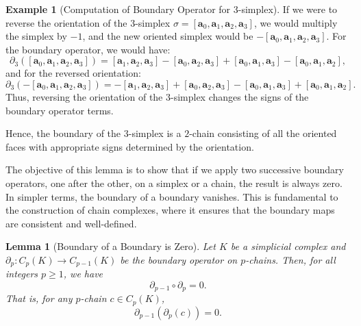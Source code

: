 \documentclass[12pt,oneside,reqno]{amsart}
\theoremstyle{plain}
\newtheorem{lemma}[theorem]{Lemma}
\theoremstyle{definition}
\newtheorem{example}{Example}[section]
\theoremstyle{remark}
\newcommand{\0}{{\textbf{0}}}
\begin{document}
\begin{example}[Computation of Boundary Operator for 3-simplex]
If we were to reverse the orientation of the $3$-simplex $\sigma = [\mathbf{a}_0, \mathbf{a}_1, \mathbf{a}_2, \mathbf{a}_3]$, we would multiply the simplex by $-1$, and the new oriented simplex would be $-[\mathbf{a}_0, \mathbf{a}_1, \mathbf{a}_2, \mathbf{a}_3]$. For the boundary operator, we would have:
\[
\partial_3([\mathbf{a}_0, \mathbf{a}_1, \mathbf{a}_2, \mathbf{a}_3]) = [\mathbf{a}_1, \mathbf{a}_2, \mathbf{a}_3] - [\mathbf{a}_0, \mathbf{a}_2, \mathbf{a}_3] + [\mathbf{a}_0, \mathbf{a}_1, \mathbf{a}_3] - [\mathbf{a}_0, \mathbf{a}_1, \mathbf{a}_2],
\]
and for the reversed orientation:
\[
\partial_3(-[\mathbf{a}_0, \mathbf{a}_1, \mathbf{a}_2, \mathbf{a}_3]) = -[\mathbf{a}_1, \mathbf{a}_2, \mathbf{a}_3] + [\mathbf{a}_0, \mathbf{a}_2, \mathbf{a}_3] - [\mathbf{a}_0, \mathbf{a}_1, \mathbf{a}_3] + [\mathbf{a}_0, \mathbf{a}_1, \mathbf{a}_2].
\]
Thus, reversing the orientation of the $3$-simplex changes the signs of the boundary operator terms.

Hence, the boundary of the $3$-simplex is a $2$-chain consisting of all the oriented faces with appropriate signs determined by the orientation.
\end{example}

The objective of this lemma is to show that if we apply two successive boundary operators, one after the other, on a simplex or a chain, the result is always zero. In simpler terms, the boundary of a boundary vanishes. This is fundamental to the construction of chain complexes, where it ensures that the boundary maps are consistent and well-defined.

\begin{lemma}[Boundary of a Boundary is Zero]\label{l:Boundary of a Boundary is Zero}
Let $K$ be a simplicial complex and $\partial_p \colon C_p(K) \to C_{p-1}(K)$ be the boundary operator on $p$-chains. Then, for all integers $p \geq 1$, we have
\[
\partial_{p-1} \circ \partial_p = 0.
\]
That is, for any $p$-chain $c \in C_p(K)$,
\[
\partial_{p-1}(\partial_p(c)) = 0.
\]
\end{lemma}
\end{document}
